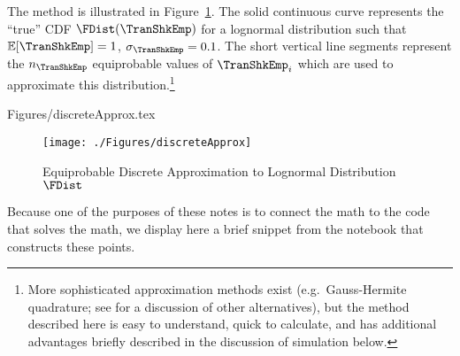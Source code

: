 \documentclass[SolvingMicroDSOPs]{subfiles}
\begin{document}
The method is illustrated in Figure~\ref{fig:discreteapprox}.  The solid continuous curve represents
the ``true'' CDF $\FDist(\TranShkEmp)$ for a lognormal distribution such that $\Ex[\TranShkEmp] = 1$, $\sigma_{\TranShkEmp} = 0.1$.  The short vertical line segments represent the $n_{\TranShkEmp}$
equiprobable values of $\TranShkEmp_{i}$ which are used to approximate this
distribution.\footnote{More sophisticated approximation methods exist
  (e.g.\ Gauss-Hermite quadrature; see \cite{kopecky2010finite} for a discussion of other alternatives), but the method described here is easy to understand, quick to calculate, and has additional advantages briefly described in the discussion of simulation below.}
\begin{verbatimwrite}{Figures/discreteApprox.tex}
  \hypertarget{discreteApprox}{}
  \begin{figure}
    \texttt{[image: ./Figures/discreteApprox]}
    \caption{Equiprobable Discrete Approximation to Lognormal Distribution $\FDist$}
    \label{fig:discreteapprox}
  \end{figure}
\end{verbatimwrite}
\unskip

Because one of the purposes of these notes is to connect the math to the code that solves the math, we display here a brief snippet from the notebook that constructs these points.


\lstset{basicstyle=\ttfamily\footnotesize,breaklines=true,language=Python,frame=single}

\end{document}
